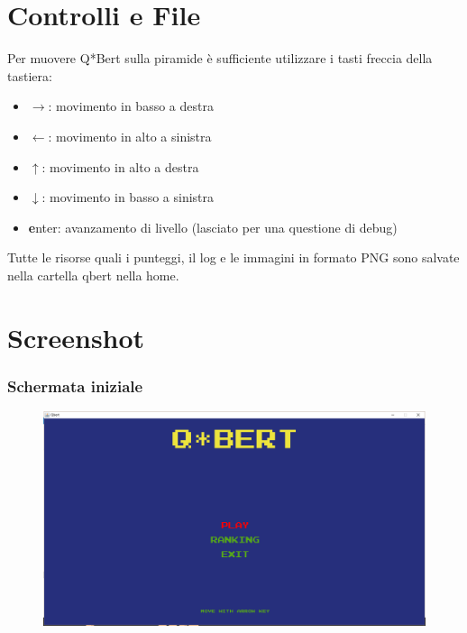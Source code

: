 \documentclass[a4paper,12pt, hidelinks]{report}
\begin{document}
\section{Controlli e File}

Per muovere Q*Bert sulla piramide è sufficiente utilizzare i tasti freccia della tastiera:

\begin{itemize}
	\item \textbf{$\rightarrow$}: movimento in basso a destra
	\item \textbf{$\leftarrow$}: movimento in alto a sinistra
	\item \textbf{$\uparrow$}: movimento in alto a destra
	\item \textbf{$\downarrow$}: movimento in basso a sinistra
	\item \textbf enter: avanzamento di livello (lasciato per una questione di debug)
\end{itemize}

Tutte le risorse quali i punteggi, il log e le immagini in formato PNG sono salvate nella cartella qbert nella home.

\section{Screenshot}

\subsubsection{Schermata iniziale}

\begin{figure}[H]
\centering{}
\includegraphics[width=\linewidth]{img/SchermataIniziale.png}
\label{img:SchermataIniziale}
\end{figure}
\end{document}
